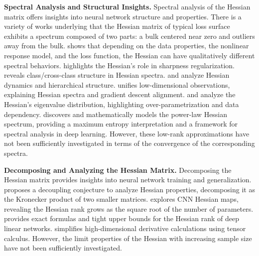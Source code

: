 \documentclass{article}
\begin{document}
\textbf{Spectral Analysis and Structural Insights.}
Spectral analysis of the Hessian matrix offers insights into neural network structure and properties. There is a variety of works \cite{sagun2018empiricalanalysishessianoverparametrized,pmlr-v97-ghorbani19b,papyan2019spectrumdeepnethessiansscale} underlying that the Hessian matrix of typical loss surface exhibits a spectrum composed of two parts: a bulk centered near zero and outliers away from the bulk. \cite{liao2021hessianeigenspectrarealisticnonlinear} shows that depending on the data properties, the nonlinear response model, and the loss function, the Hessian can have qualitatively different spectral behaviors. \cite{dauphin2024neglectedhessiancomponentexplains} highlights the Hessian's role in sharpness regularization. \cite{papyan2020tracesclasscrossclassstructurepervade} reveals class/cross-class structure in Hessian spectra. \cite{papyan2019spectrumdeepnethessiansscale} and \cite{papyan2019measurementsthreelevelhierarchicalstructure} analyze Hessian dynamics and hierarchical structure. \cite{garrod2024unifyinglowdimensionalobservations} unifies low-dimensional observations, explaining Hessian spectra and gradient descent alignment. \cite{sagun2017eigenvalueshessiandeeplearning} and \cite{sagun2018empiricalanalysishessianoverparametrized} analyze the Hessian's eigenvalue distribution, highlighting over-parametrization and data dependency. \cite{xie2022powerlawhessianspectrumsdeep} discovers and mathematically models the power-law Hessian spectrum, providing a maximum entropy interpretation and a framework for spectral analysis in deep learning. However, these low-rank approximations have not been sufficiently investigated in terms of the convergence of the corresponding spectra.

\textbf{Decomposing and Analyzing the Hessian Matrix.}
Decomposing the Hessian matrix provides insights into neural network training and generalization. \cite{wu2022dissectinghessianunderstandingcommon} proposes a decoupling conjecture to analyze Hessian properties, decomposing it as the Kronecker product of two smaller matrices. \cite{singh2023hessianperspectivenatureconvolutional} explores CNN Hessian maps, revealing the Hessian rank grows as the square root of the number of parameters. \cite{singh2021analyticinsightsstructurerank} provides exact formulas and tight upper bounds for the Hessian rank of deep linear networks. \cite{skorski2019chainruleshessianhigher} simplifies high-dimensional derivative calculations using tensor calculus. However, the limit properties of the Hessian with increasing sample size have not been sufficiently investigated. 
\end{document}
